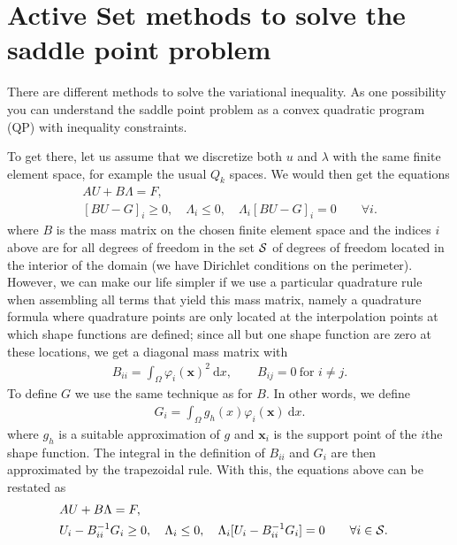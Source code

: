 \documentclass{article}
\begin{document}
\section{Active Set methods to solve the saddle point problem}

There are different methods to solve the variational inequality. As one
possibility you can understand the saddle point problem as a convex quadratic program (QP) with
inequality constraints.

To get there, let us assume that we discretize both $u$ and $\lambda$ with the
same finite element space, for example the usual $Q_k$ spaces. We would then
get the equations
\begin{eqnarray*}
 &A U + B\Lambda = F,&\\
 &[BU-G]_i \geq 0, \quad \Lambda_i \leq 0,\quad \Lambda_i[BU-G]_i = 0
\qquad \forall i.&
\end{eqnarray*}
where $B$ is the mass matrix on the chosen finite element space and the
indices $i$ above are for all degrees of freedom in the set $\cal S$ of degrees of
freedom located in the interior of the domain
(we have Dirichlet conditions on the perimeter). However, we
can make our life simpler if we use a particular quadrature rule when
assembling all terms that yield this mass matrix, namely a quadrature formula
where quadrature points are only located at the interpolation points at
which shape functions are defined; since all but one shape function are zero
at these locations, we get a diagonal mass matrix with
\begin{align*}
  B_{ii} = \int_\Omega \varphi_i(\mathbf x)^2\ \textrm{d}x,
  \qquad
  B_{ij}=0 \ \text{for } i\neq j.
\end{align*}
To define $G$ we use the same technique as for $B$. In other words, we
define
\begin{align*}
  G_{i} = \int_\Omega g_h(x) \varphi_i(\mathbf x)\ \textrm{d}x.
\end{align*}
where $g_h$ is a
suitable approximation of $g$ and $\mathbf x_i$ is the support point of the
$i$the shape function. The integral in the definition of $B_{ii}$ and $G_i$
are then approximated by the trapezoidal rule.
With this, the equations above can be restated as
\begin{eqnarray*}
 &A U + B\Lambda = F,&\\
 &U_i-B_{ii}^{-1}G_i \ge 0, \quad \Lambda_i \leq 0,\quad \Lambda_i[U_i-B_{ii}^{-1}G_i] = 0
\qquad \forall i\in{\cal S}.&
\end{eqnarray*}
\end{document}
